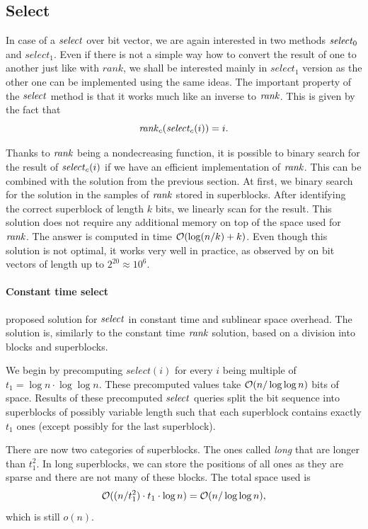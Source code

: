\subsection{Select}
\label{section:select}

In case of a $\mathit{select}$ over bit vector, we are again interested in two methods $\mathit{select}_0$
and $select_1$. Even if there is not a simple way how to convert the result of one to
another just like with $rank$, we shall be interested mainly in $select_1$ version as the
other one can be implemented using the same ideas. The important property of the $\mathit{select}$
method is that it works much like an inverse to $\mathit{rank}$. This is given by the fact that
$$\mathit{rank}_c(\mathit{select}_c(i)) = i.$$

Thanks to $\mathit{rank}$ being a nondecreasing function, it is possible to binary search for the
result of $\mathit{select}_c(i)$ if we have an efficient implementation of $\mathit{rank}$. This can be combined
with the solution from the previous section. At first, we binary search for the solution in the
samples of $\mathit{rank}$ stored in superblocks. After identifying the correct superblock of length $k$
bits, we linearly scan for the result. This solution does not require any additional memory on top
of the space used for $\mathit{rank}$. The answer is computed in time $\mathcal{O}(\log(n/k)+k)$. Even though this
solution is not optimal, it works very well in practice, as observed by \cite{gonzalez2005practical}
on bit vectors of length up to $2^{20}\approx 10^6$.

\paragraph{Constant time select}

\cite{clark1997compact} proposed solution for $\mathit{select}$ in constant time and sublinear space
overhead. The solution is, similarly to the constant time $\mathit{rank}$ solution, based on a division
into blocks and superblocks.

We begin by precomputing $select(i)$ for every $i$ being multiple of $t_1=\log n\cdot \log\log n$.
These precomputed values take $\mathcal{O}(n/\log\log n)$ bits of space. Results of these precomputed
$\mathit{select}$ queries split the bit sequence into superblocks of possibly variable length such that
each superblock contains exactly $t_1$ ones (except possibly for the last superblock).

There are now two categories of superblocks. The ones called \textit{long} that are longer
than $t_1^2$. In long superblocks, we can store the positions of all ones as they are sparse
and there are not many of these blocks. The total space used is $$\mathcal{O}((n/t_1^2)\cdot t_1\cdot
\log n) = \mathcal{O}(n/\log\log n),$$ which is still $o(n)$.

